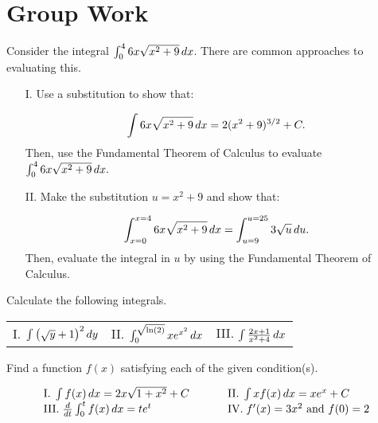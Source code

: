 \documentclass[handout,hints]{ximera}
\begin{document}
\section{Group Work}

\begin{problem}
Consider the integral $\int_0^4  6x\sqrt{x^2+9} \mathop{}\!d x$.  There are common approaches to evaluating this.

\begin{itemize}
\item[I.] Use a substitution to show that:

\[\int  6x\sqrt{x^2+9} \mathop{}\!d x = 2(x^2+9)^{3/2} +C.\]  
Then, use the Fundamental Theorem of Calculus to evaluate $\int_0^4  6x\sqrt{x^2+9} \mathop{}\!d x.$ 

\item[II.] Make the substitution $u=x^2+9$ and show that:

\[\int_{x=0}^{x=4}  6x\sqrt{x^2+9} \mathop{}\!d x = \int_{u=9}^{u=25} 3\sqrt{u} \mathop{}\!d u.\]  Then, evaluate the integral in $u$ by using the Fundamental Theorem of Calculus.
\end{itemize}


\end{problem}

\begin{problem}
Calculate the following integrals.

\begin{tabular}{lll}
I.  $\int \left(\sqrt{y}+1\right)^2 \mathop{}\!d y$ \hspace{.5in} & II. $\int_0^{\sqrt{\ln(2)}} x e^{x^2} \mathop{}\!d x$ \hspace{.5in} & III. $\int \frac{2x+1}{x^2+4} \mathop{}\!d x$ \hspace{.05in}
\end{tabular}

\end{problem}



\begin{problem}
Find a function $f(x)$ satisfying each of the given condition(s).

$$
\begin{array}{lll}
\mathrm{I.} \; \int f(x) \mathop{}\!d x = 2x \sqrt{1+ x^2} + C & \hspace{.2in} & \mathrm{II.} \; \int xf(x) \mathop{}\!d x = x e^x + C \\
\mathrm{III.} \; \frac{\mathop{}\!d}{\mathop{}\!d t} \int_0^t f(x) \mathop{}\!d x = t e^t & \hspace{.2in} & \mathrm{IV.} \; f'(x) = 3x^2 \mbox{ and } f(0)=2
\end{array}
$$
\end{problem}
\end{document}
